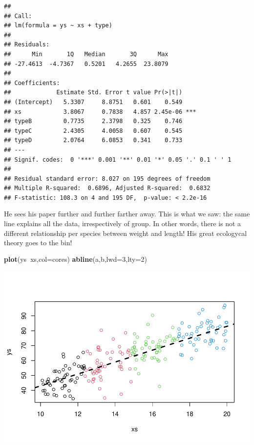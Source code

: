 \documentclass[
]{book}
\newenvironment{Shaded}{\begin{snugshade}}{\end{snugshade}}
\newcommand{\DataTypeTok}[1]{\textcolor[rgb]{0.13,0.29,0.53}{#1}}
\newcommand{\DecValTok}[1]{\textcolor[rgb]{0.00,0.00,0.81}{#1}}
\newcommand{\KeywordTok}[1]{\textcolor[rgb]{0.13,0.29,0.53}{\textbf{#1}}}
\newcommand{\NormalTok}[1]{#1}
\newcommand{\OperatorTok}[1]{\textcolor[rgb]{0.81,0.36,0.00}{\textbf{#1}}}
\begin{document}
\begin{verbatim}
## 
## Call:
## lm(formula = ys ~ xs + type)
## 
## Residuals:
##      Min       1Q   Median       3Q      Max 
## -27.4613  -4.7367   0.5201   4.2655  23.8079 
## 
## Coefficients:
##             Estimate Std. Error t value Pr(>|t|)    
## (Intercept)   5.3307     8.8751   0.601    0.549    
## xs            3.8067     0.7838   4.857 2.45e-06 ***
## typeB         0.7735     2.3798   0.325    0.746    
## typeC         2.4305     4.0058   0.607    0.545    
## typeD         2.0764     6.0853   0.341    0.733    
## ---
## Signif. codes:  0 '***' 0.001 '**' 0.01 '*' 0.05 '.' 0.1 ' ' 1
## 
## Residual standard error: 8.027 on 195 degrees of freedom
## Multiple R-squared:  0.6896,	Adjusted R-squared:  0.6832 
## F-statistic: 108.3 on 4 and 195 DF,  p-value: < 2.2e-16
\end{verbatim}

He sees his paper further and further farther away. This is what we saw: the same line explains all the data, irrespectively of group. In other words, there is not a different relationship per species between weight and length! His great ecologycal theory goes to the bin!

\begin{Shaded}
\begin{Highlighting}[]
\KeywordTok{plot}\NormalTok{(ys}\OperatorTok{~}\NormalTok{xs,}\DataTypeTok{col=}\NormalTok{cores)}
\KeywordTok{abline}\NormalTok{(a,b,}\DataTypeTok{lwd=}\DecValTok{3}\NormalTok{,}\DataTypeTok{lty=}\DecValTok{2}\NormalTok{)}
\end{Highlighting}
\end{Shaded}

\includegraphics{ECOMODbook_files/figure-latex/a10.8-1.pdf}
\end{document}
